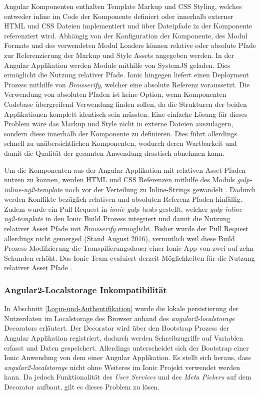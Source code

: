 Angular Komponenten enthalten Template Markup und \ac{CSS} Styling, welches entweder inline im Code der Komponente
definiert oder innerhalb externer \ac{HTML} und \ac{CSS} Dateien implementiert und über Dateipfade in der Komponente referenziert wird.
Abhängig von der Konfiguration der Komponente, des Modul Formats und des verwendeten Modul Loaders
können relative oder absolute Pfade zur Referenzierung der Markup und Style Assets angegeben werden.
In der Angular Applikation werden Module mithilfe von SystemJS geladen. Dies ermöglicht die Nutzung relativer Pfade.
Ionic hingegen liefert einen Deployment Prozess mithilfe von \emph{Browserify}, welcher eine absolute Referenz voraussetzt.
Die Verwendung von absoluten Pfaden ist keine Option, wenn Komponenten Codebase übergreifend Verwendung finden sollen,
da die Strukturen der beiden Applikationen komplett identisch sein müssten.
Eine einfache Lösung für dieses Problem wäre das Markup und Style nicht in externe Dateien auszulagern,
sondern diese innerhalb der Komponente zu definieren.
Dies führt allerdings schnell zu unübersichtlichen Komponenten,
wodurch deren Wartbarkeit und damit die Qualität der gesamten Anwendung drastisch abnehmen kann.

Um die Komponenten aus der Angular Applikation mit relativen Asset Pfaden nutzen zu können,
werden \ac{HTML} und \ac{CSS} Referenzen mithilfe des Moduls \emph{gulp-inline-ng2-template} noch vor der Verteilung zu Inline-Strings gewandelt \cite{ludoh30:online}.
Dadurch werden Konflikte bezüglich relativen und absoluten Referenz-Pfaden hinfällig.
Zudem wurde ein Pull Request in \emph{ionic-gulp-tasks} gestellt, welcher \emph{gulp-inline-ng2-template}
in den Ionic Build Prozess integriert und damit die Nutzung relativer Asset Pfade mit \emph{Browserify} ermöglicht.
Bisher wurde der Pull Request allerdings nicht gemerged (Stand August 2016), vermutlich weil diese Build Prozess Modifzierung die
Transpilierungsdauer einer Ionic App von zwei auf zehn Sekunden erhöht.
Das Ionic Team evaluiert derzeit Möglichkeiten für die Nutzung relativer Asset Pfade \cite{relat31:online}.

\subsubsection{Angular2-Localstorage Inkompatibilität}
In Abschnitt \ref{Login-und-Authentifikation} wurde die lokale persistierung der Nutzerdaten im Localstorage
des Browser anhand des \emph{angular2-localstorage} Decorators erläutert.
Der Decorator wird über den Bootstrap Prozess der Angular Applikation registriert,
dadurch werden Schreibzugriffe auf Variablen erfasst und Daten gespeichert.
Allerdings unterscheidet sich der Bootstrap einer Ionic Anwendung von dem einer Angular Applikation.
Es stellt sich heraus, dass \emph{angular2-localstorage} nicht ohne Weiteres im Ionic Projekt verwendet werden kann.
Da jedoch Funktionalität des \emph{User Services} und des \emph{Meta Pickers} auf dem Decorator aufbaut,
gilt es dieses Problem zu lösen.

